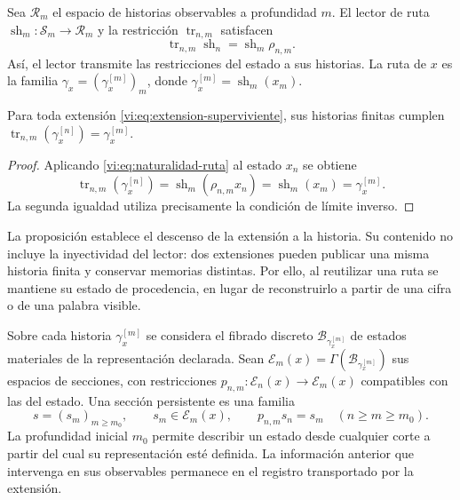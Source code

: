 Sea $\mathcal R_m$ el espacio de historias observables a profundidad $m$.
El lector de ruta $\operatorname{sh}_m:\mathcal S_m\to\mathcal R_m$
y la restricción $\operatorname{tr}_{n,m}$ satisfacen
\begin{equation}
 \operatorname{tr}_{n,m}\operatorname{sh}_n
 =\operatorname{sh}_m\rho_{n,m}.
 \label{vi:eq:naturalidad-ruta}
\end{equation}
Así, el lector transmite las restricciones del estado a sus historias.
La ruta de $x$ es la familia
$\gamma_x=(\gamma_x^{[m]})_m$, donde
$\gamma_x^{[m]}=\operatorname{sh}_m(x_m)$.

\begin{proposition}
\label{vi:prop:historia-compatible}
Para toda extensión \eqref{vi:eq:extension-superviviente}, sus historias
finitas cumplen
$\operatorname{tr}_{n,m}(\gamma_x^{[n]})=\gamma_x^{[m]}$.
\end{proposition}
\begin{proof}
Aplicando \eqref{vi:eq:naturalidad-ruta} al estado $x_n$ se obtiene
\[
 \operatorname{tr}_{n,m}(\gamma_x^{[n]})
 =\operatorname{sh}_m(\rho_{n,m}x_n)
 =\operatorname{sh}_m(x_m)=\gamma_x^{[m]}.
\]
La segunda igualdad utiliza precisamente la condición de límite inverso.
\end{proof}

La proposición establece el descenso de la extensión a la historia.
Su contenido no incluye la inyectividad del lector: dos extensiones
pueden publicar una misma historia finita y conservar memorias distintas.
Por ello, al reutilizar una ruta se mantiene su estado de procedencia,
en lugar de reconstruirlo a partir de una cifra o de una palabra visible.

Sobre cada historia $\gamma_x^{[m]}$ se considera el fibrado discreto
$\mathcal B_{\gamma_x^{[m]}}$ de estados materiales de la representación
declarada. Sean
$\mathscr E_m(x)=\Gamma(\mathcal B_{\gamma_x^{[m]}})$ sus espacios
de secciones, con restricciones
$p_{n,m}:\mathscr E_n(x)\to\mathscr E_m(x)$ compatibles con las
del estado. Una sección persistente es una familia
\begin{equation}
 s=(s_m)_{m\geq m_0},\qquad s_m\in\mathscr E_m(x),\qquad
 p_{n,m}s_n=s_m\quad(n\geq m\geq m_0).
 \label{vi:eq:seccion-persistente}
\end{equation}
La profundidad inicial $m_0$ permite describir un estado desde cualquier
corte a partir del cual su representación esté definida. La información
anterior que intervenga en sus observables permanece en el registro
transportado por la extensión.

